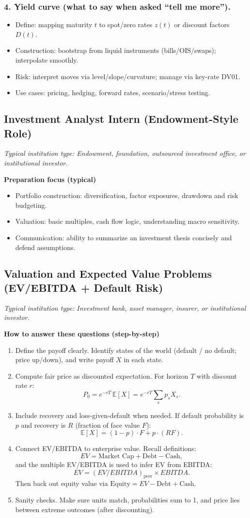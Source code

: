 \documentclass[11pt,letterpaper,openany]{book}
\newcommand{\RoleProfile}[2]{%
  \subsection{#1}%
  \noindent\textit{Typical institution type: #2.}\par
}
\newcommand{\prompt}[1]{\subsubsection*{#1}}
\begin{document}
\prompt{4. Yield curve (what to say when asked ``tell me more'').}
\begin{itemize}
  \item Define: mapping maturity $t$ to spot/zero rates $z(t)$ or discount factors $D(t)$.
  \item Construction: bootstrap from liquid instruments (bills/OIS/swaps); interpolate smoothly.
  \item Risk: interpret moves via level/slope/curvature; manage via key-rate DV01.
  \item Use cases: pricing, hedging, forward rates, scenario/stress testing.
\end{itemize}

\RoleProfile{Investment Analyst Intern (Endowment-Style Role)}{Endowment, foundation, outsourced investment office, or institutional investor}
\textbf{Preparation focus (typical)}
\begin{itemize}
  \item Portfolio construction: diversification, factor exposures, drawdown and risk budgeting.
  \item Valuation: basic multiples, cash flow logic, understanding macro sensitivity.
  \item Communication: ability to summarize an investment thesis concisely and defend assumptions.
\end{itemize}

\RoleProfile{Valuation and Expected Value Problems (EV/EBITDA + Default Risk)}{Investment bank, asset manager, insurer, or institutional investor}
\textbf{How to answer these questions (step-by-step)}
\begin{enumerate}
  \item Define the payoff clearly. Identify states of the world (default / no default; price up/down), and write payoff $X$ in each state.
  \item Compute fair price as discounted expectation. For horizon $T$ with discount rate $r$:
  \[
    P_0 = e^{-rT}\,\mathbb{E}[X] = e^{-rT}\sum_s p_s X_s.
  \]
  \item Include recovery and loss-given-default when needed. If default probability is $p$ and recovery is $R$ (fraction of face value $F$):
  \[
    \mathbb{E}[X] = (1 - p)\cdot F + p\cdot (RF).
  \]
  \item Connect EV/EBITDA to enterprise value. Recall definitions:
  \[
    EV = \text{Market Cap} + \text{Debt} - \text{Cash},
  \]
  and the multiple EV/EBITDA is used to infer EV from EBITDA:
  \[
    EV = (EV/EBITDA)_{\mathrm{peer}} \times EBITDA.
  \]
  Then back out equity value via $\text{Equity} = EV - \text{Debt} + \text{Cash}$.
  \item Sanity checks. Make sure units match, probabilities sum to 1, and price lies between extreme outcomes (after discounting).
\end{enumerate}
\end{document}
